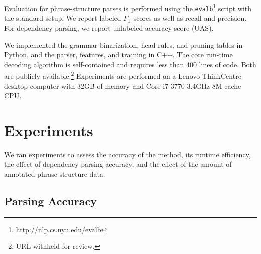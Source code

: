 \documentclass[11pt,letterpaper]{article}
\newcommand{\nascomment}[1]{\textcolor{blue}{\bf \small [#1 --nas]}}
\begin{document}
Evaluation for phrase-structure parses is performed using the
\texttt{evalb}\footnote{\url{http://nlp.cs.nyu.edu/evalb}} script with the
standard setup. We report labeled $F_1$ scores as well as recall and
precision. For dependency parsing, we report unlabeled accuracy score
(UAS).

We implemented the grammar binarization, head rules, and pruning
tables in Python, and the parser, features, and training in C++. The
core run-time decoding algorithm is self-contained and requires less
than 400 lines of code. Both are publicly available.\footnote{URL withheld
  for review.} Experiments are performed on a Lenovo ThinkCentre desktop computer
with 32GB of memory and  Core i7-3770 3.4GHz 8M cache CPU.



\section{Experiments}
\label{sec:exper}

We ran experiments to assess the accuracy of the method, its runtime
efficiency, the effect of dependency parsing accuracy,
and the effect of the amount of annotated phrase-structure
data.


\subsection{Parsing Accuracy}
\end{document}
